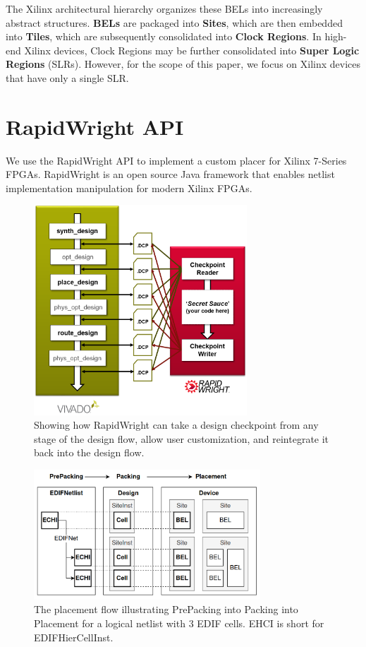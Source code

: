 \documentclass[twocolumn]{article}
\begin{document}
    The Xilinx architectural hierarchy organizes these BELs into increasingly abstract structures. 
    \textbf{BELs} are packaged into \textbf{Sites}, which are then embedded into \textbf{Tiles}, which are subsequently consolidated into \textbf{Clock Regions}. 
    In high-end Xilinx devices, Clock Regions may be further consolidated into \textbf{Super Logic Regions} (SLRs). 
    However, for the scope of this paper, we focus on Xilinx devices that have only a single SLR. 


\section{RapidWright API}
    We use the RapidWright API to implement a custom placer for Xilinx 7-Series FPGAs.
    RapidWright is an open source Java framework that enables netlist implementation manipulation for modern Xilinx FPGAs. 

    \begin{figure}[]
        \centering
        \includegraphics[width=8.0cm]{figures/vivado_dcps.png}
        \caption{Showing how RapidWright can take a design checkpoint from any stage of the design flow, allow user customization, and reintegrate it back into the design flow.}
        \label{fig:vivado_dcps}
    \end{figure}

    \begin{figure}[]
        \centering
        \includegraphics[width=8.5cm]{figures/edif_design_device.png}
        \caption{The placement flow illustrating PrePacking into Packing into Placement for a logical netlist with 3 EDIF cells. EHCI is short for EDIFHierCellInst.}
        \label{fig:edif_design_device}
    \end{figure}
\end{document}
